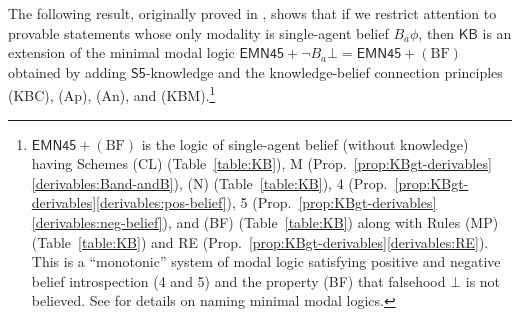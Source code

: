 \documentclass[12pt]{article}
\theoremstyle{definition}
\newcommand{\KB}{{\mathsf{KB}}}                        %
\begin{document}
The following result, originally proved in \cite{EijRen14:BEPL}, shows
that if we restrict attention to provable statements whose only
modality is single-agent belief $B_a\phi$, then $\KB$ is an extension
of the minimal modal logic $\mathsf{EMN45}+\lnot
B_a\bot=\mathsf{EMN45}+(\text{BF})$ obtained by adding
$\mathsf{S5}$-knowledge and the knowledge-belief connection principles
(KBC), (Ap), (An), and (KBM).\footnote{$\mathsf{EMN45}+(\text{BF})$ is
  the logic of single-agent belief (without knowledge) having Schemes
  (CL) (Table~\ref{table:KB}), M
  (Prop.~\ref{prop:KBgt-derivables}\eqref{derivables:Band-andB}), (N)
  (Table~\ref{table:KB}), 4
  (Prop.~\ref{prop:KBgt-derivables}\eqref{derivables:pos-belief}), 5
  (Prop.~\ref{prop:KBgt-derivables}\eqref{derivables:neg-belief}), and
  (BF) (Table~\ref{table:KB}) along with Rules (MP)
  (Table~\ref{table:KB}) and RE
  (Prop.~\ref{prop:KBgt-derivables}\eqref{derivables:RE}). This is a
  ``monotonic'' system of modal logic satisfying positive and negative
  belief introspection (4 and 5) and the property (BF) that falsehood
  $\bot$ is not believed. See \cite[Ch.~8]{Chellas:ml} for details on
  naming minimal modal logics.}
\end{document}
